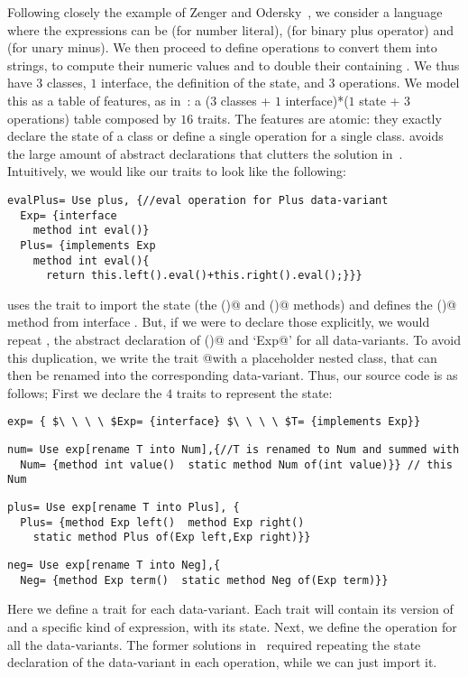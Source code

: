 Following closely
the example of Zenger and Odersky~\cite{Zenger-Odersky2005},
we consider a language where the
expressions \Q@Exp@ can
be \Q@Num@ (for number literal),
\Q@Plus@ (for binary plus operator)
and \Q@Neg@ (for unary minus).
We then proceed to define operations
\Q@show@ to convert them into strings,
 \Q@eval@ to compute their numeric values and 
\Q@double@ to double their containing \Q@Num@s.
We thus have $3$ classes, $1$ interface,
the definition of the state, and $3$ operations.
We model this
as a table of features, as in~\cite{deep}:
a ($3$ classes + $1$ interface)*($1$ state + $3$ operations)
table composed by $16$ traits.
The features are atomic: they exactly 
declare the state of a class
or define a single operation for a single class.
\name avoids the large amount of abstract declarations
that clutters the solution in~\cite{deep}.
Intuitively, we would like our traits to look like the following:
\begin{lstlisting}
evalPlus= Use plus, {//eval operation for Plus data-variant
  Exp= {interface
    method int eval()}
  Plus= {implements Exp
    method int eval(){
      return this.left().eval()+this.right().eval();}}}
\end{lstlisting}
\Q@evalPlus@ uses the trait \Q@plus@ to import the state (the \Q@left()@ and \Q@right()@ methods)
and defines the \Q@eval()@ method from interface \Q@Exp@.
But, if we were to declare those
explicitly, we would repeat \Q@Exp@, the abstract
declaration of \Q@eval()@ and `\Q@implements Exp@'
for all data-variants.
To avoid this duplication,  we write 
the trait \Q@eval @with a placeholder \Q@T@ nested class, that can then be renamed
into the corresponding data-variant.
Thus, our source code is as follows;
First we declare the $4$ traits to represent the state:
\newcommand\multiCode{\vspace{-5pt}}
\saveSpace
\begin{lstlisting}
exp= { $\ \ \ \ $Exp= {interface} $\ \ \ \ $T= {implements Exp}}
\end{lstlisting}
\multiCode
\begin{lstlisting}
num= Use exp[rename T into Num],{//T is renamed to Num and summed with
  Num= {method int value()  static method Num of(int value)}} // this Num
\end{lstlisting}
\multiCode
\begin{lstlisting}
plus= Use exp[rename T into Plus], {
  Plus= {method Exp left()  method Exp right()
    static method Plus of(Exp left,Exp right)}}
\end{lstlisting}
\multiCode
\begin{lstlisting}
neg= Use exp[rename T into Neg],{
  Neg= {method Exp term()  static method Neg of(Exp term)}}
\end{lstlisting}
Here we define a trait for each data-variant.
Each trait will contain its version of \Q@Exp@
and a specific kind of expression, with its state.
Next, we define the operation \Q@eval@ for all the data-variants.
The former solutions in~\cite{deep}
required repeating the state declaration of the 
data-variant in each operation, while we can just import it.

